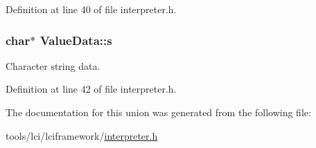 Definition at line 40 of file interpreter.\-h.

\hypertarget{union_value_data_a2639b48549e0788d5f9a3da6ea9cb0e4}{
\subsubsection[{s}]{\setlength{\rightskip}{0pt plus 5cm}char$\ast$ {\bf Value\-Data\-::s}}}\label{union_value_data_a2639b48549e0788d5f9a3da6ea9cb0e4}
Character string data. 

Definition at line 42 of file interpreter.\-h.



The documentation for this union was generated from the following file\-:\begin{DoxyCompactItemize}
\item 
tools/lci/lciframework/\hyperlink{interpreter_8h}{interpreter.\-h}\end{DoxyCompactItemize}

